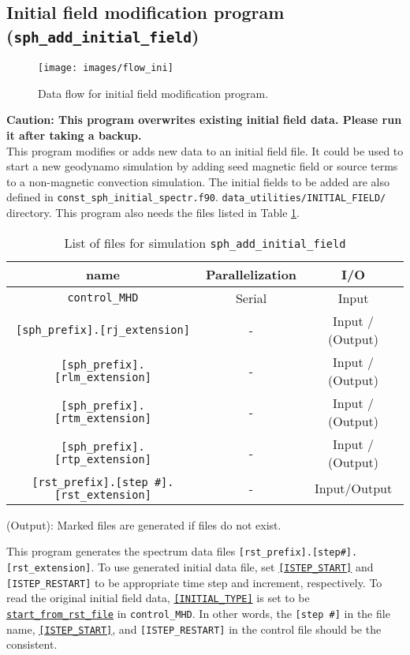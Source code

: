 \subsection{Initial field modification program \\
({\tt sph\_add\_initial\_field})}
\label{sec:add_initial_field}
%
\begin{figure}[htbp]
\begin{center}
\texttt{[image: images/flow\_ini]}
\end{center}
\caption{Data flow for initial field modification program.}
\label{fig:flow_add_ini}
\end{figure}
%
{\bf Caution: This program overwrites existing initial field data. Please run it after taking a backup.} \\

 This program modifies or adds new data to an initial field file. It could be used to start a new geodynamo simulation by adding seed magnetic field or source terms to a non-magnetic convection simulation. The initial fields to be added are also defined in \verb|const_sph_initial_spectr.f90|. \verb|data_utilities/INITIAL_FIELD/| directory. This program also needs the files listed in Table \ref{table:add_inital_fld}.
%
\begin{table}[htp]
\caption{List of files for simulation {\tt sph\_add\_initial\_field} }
\begin{center} 
\begin{tabular}{|c|c|c|}
\hline
 name & Parallelization & I/O \\ \hline \hline
\verb|control_MHD| & Serial & Input \\ \hline
\verb|[sph_prefix].[rj_extension]|  & - & Input / (Output) \\
\verb|[sph_prefix].[rlm_extension]| & - & Input / (Output)  \\
\verb|[sph_prefix].[rtm_extension]| & - & Input / (Output)  \\
\verb|[sph_prefix].[rtp_extension]| & - & Input / (Output)  \\ \hline
\verb|[rst_prefix].[step #].[rst_extension]| & - & Input/Output  \\ \hline
\end{tabular}
\end{center}
(Output): Marked files are generated if files do not exist.
\label{table:add_inital_fld}
\end{table}
%
This program generates the spectrum data files \verb|[rst_prefix].[step#].[rst_extension]|. To use generated initial data file, set 
 \hyperref[href_t:i_step_init_ctl]{{\tt [ISTEP\_START]}} and \verb|[ISTEP_RESTART]| to be appropriate time step and increment, respectively.
To read the original initial field data, \hyperref[href_t:restart_file_ctl]{{\tt [INITIAL\_TYPE]}} is set to be \hyperref[href_t:restart_file_ctl]{{\tt start\_from\_rst\_file}} in \verb|control_MHD|. In other words, the \verb|[step #]| in the file name, \hyperref[href_t:i_step_init_ctl]{{\tt [ISTEP\_START]}}, and \verb|[ISTEP_RESTART]| in the control file should be the consistent.

